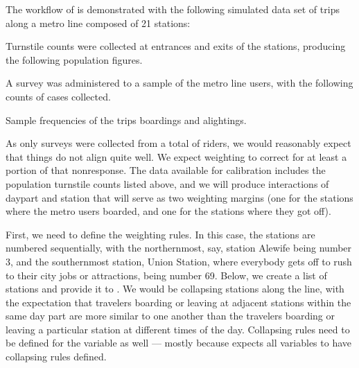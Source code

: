 The workflow of  is demonstrated with the following
simulated data set of trips along a metro line composed of 21 stations:

\begin{stlog}
\nullskip
\end{stlog}

\cnp

Turnstile counts were collected at entrances and exits of the stations, producing the following
population figures.

\noindent
\begin{stlog}
\nullskip
\end{stlog}

\clearpage\newpage

A survey was administered to a sample of the metro line users, with the following counts
of cases collected.

\begin{table}

\caption{Sample frequencies of the trips boardings and alightings. \label{tab:sample:xtab}}

\noindent
\begin{stlog}
\nullskip
\end{stlog}

\end{table}

As only \nullskip surveys were collected from a total of
\nullskip riders, we would reasonably expect
that things do not align quite well. We expect weighting to correct for at least a portion of
that nonresponse. The data available for calibration includes the population turnstile counts
listed above, and we will produce interactions of daypart and station that will serve as two
weighting margins (one for the stations where the metro users boarded, and one for the stations
where they got off).

First, we need to define the weighting rules. In this case, the stations are numbered sequentially,
with the northernmost, say, station Alewife being number 3, and the southernmost station,
Union Station, where everybody gets off to rush to their city jobs or attractions, being number 69.
Below, we create a list of stations and provide it to .
We would be collapsing stations along the line, with the expectation that travelers boarding or leaving
at adjacent stations within the same day part are more similar to one another than the travelers
boarding or leaving a particular station at different times of the day. Collapsing rules
need to be defined for the  variable as well --- mostly because 
expects all variables to have collapsing rules defined.

